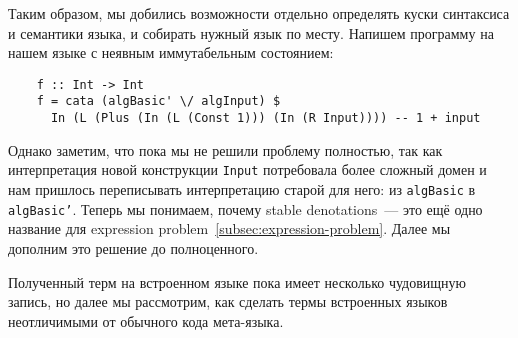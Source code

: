 Таким образом, мы добились возможности отдельно определять куски синтаксиса и семантики языка, и собирать нужный язык по месту.
Напишем программу на нашем языке с неявным иммутабельным состоянием:
\begin{verbatim}
    f :: Int -> Int
    f = cata (algBasic' \/ algInput) $
      In (L (Plus (In (L (Const 1))) (In (R Input)))) -- 1 + input
\end{verbatim}

Однако заметим, что пока мы не решили проблему полностью, так как интерпретация новой конструкции \texttt{Input} потребовала более сложный домен и нам пришлось переписывать интерпретацию старой для него: из \texttt{algBasic} в \texttt{algBasic'}.
Теперь мы понимаем, почему stable denotations~--- это ещё одно название для expression problem~\ref{subsec:expression-problem}.
Далее мы дополним это решение до полноценного. %

Полученный терм на встроенном языке пока имеет несколько чудовищную запись, но далее мы рассмотрим, как сделать термы встроенных языков неотличимыми от обычного кода мета-языка.
